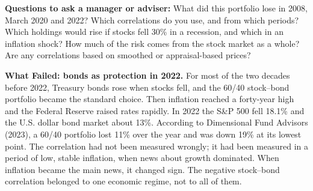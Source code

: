 \textbf{Questions to ask a manager or adviser:} What did this portfolio lose in 2008, March 2020 and 2022? Which correlations do you use, and from which periods? Which holdings would rise if stocks fell 30\% in a recession, and which in an inflation shock? How much of the risk comes from the stock market as a whole? Are any correlations based on smoothed or appraisal-based prices?

\begin{callout}
\textbf{What Failed: bonds as protection in 2022.} For most of the two decades before 2022, Treasury bonds rose when stocks fell, and the 60/40 stock--bond portfolio became the standard choice. Then inflation reached a forty-year high and the Federal Reserve raised rates rapidly. In 2022 the S\&P 500 fell 18.1\% and the U.S. dollar bond market about 13\%. According to Dimensional Fund Advisors (2023), a 60/40 portfolio lost 11\% over the year and was down 19\% at its lowest point. The correlation had not been measured wrongly; it had been measured in a period of low, stable inflation, when news about growth dominated. When inflation became the main news, it changed sign. The negative stock--bond correlation belonged to one economic regime, not to all of them.
\end{callout}
